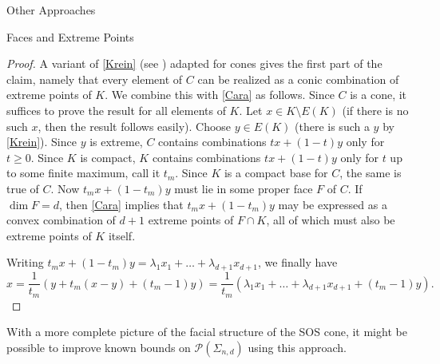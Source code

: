 \documentclass[12pt,oneside,final]{ucthesisucsbmath2010}
\newcommand{\p}{\mathcal{P}}
\newcommand{\snd}{\Sigma_{n,d}}
\theoremstyle{definition}
\begin{document}
\begin{chapter}{Other Approaches}
\begin{section}{Faces and Extreme Points}
\begin{proof} A variant of \ref{Krein} (see \cite{Barvinok}) adapted for cones gives the first part of the claim, namely that every element of $C$ can be realized as a conic combination of extreme points of $K$. We combine this with \ref{Cara} as follows. Since $C$ is a cone, it suffices to prove the result for all elements of $K$. Let $x \in K\setminus E(K)$ (if there is no such $x$, then the result follows easily). Choose $y \in E(K)$ (there is such a $y$ by \ref{Krein}). Since $y$ is extreme, $C$ contains combinations $tx+(1-t)y$ only for $t\geq 0$. Since $K$ is compact, $K$ contains combinations $tx+(1-t)y$ only for $t$ up to some finite maximum, call it $t_m$. Since $K$ is a compact base for $C$, the same is true of $C$. Now $t_mx+(1-t_m)y$ must lie in some proper face $F$ of $C$. If $\dim F = d$, then \ref{Cara} implies that $t_mx+(1-t_m)y$ may be expressed as a convex combination of $d+1$ extreme points of $F\cap K$, all of which must also be extreme points of $K$ itself.

Writing $t_mx+(1-t_m)y=\lambda_1x_1+\ldots+\lambda_{d+1}x_{d+1}$, we finally have \[x =\frac{1}{t_m}(y+t_m(x-y)+(t_m-1)y)=\frac{1}{t_m}(\lambda_1x_1+\ldots+\lambda_{d+1}x_{d+1}+(t_m-1)y).\]
\end{proof}
With a more complete picture of the facial structure of the SOS cone, it might be possible to improve known bounds on $\p(\snd)$ using this approach.
\end{section}

\label{ch4}

\end{chapter}


\end{document}
